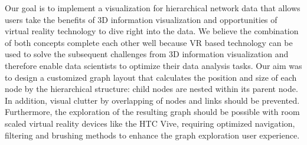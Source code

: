 Our goal is to implement a visualization for hierarchical network data that allows users take the benefits of 3D information visualization and opportunities of virtual reality technology to dive right into the data. We believe the combination of both concepts complete each other well because VR based technology can be used to solve the subsequent challenges from 3D information visualization and therefore enable data scientists to optimize their data analysis tasks. 
Our aim was to design a customized graph layout that calculates the position and size of each node by the hierarchical structure: child nodes are nested within its parent node. 
In addition, visual clutter by overlapping of nodes and links should be prevented. 
Furthermore, the exploration of the resulting graph should be possible with room scaled virtual reality devices like the HTC Vive, requiring optimized navigation, filtering and brushing methods to enhance the graph exploration user experience.

